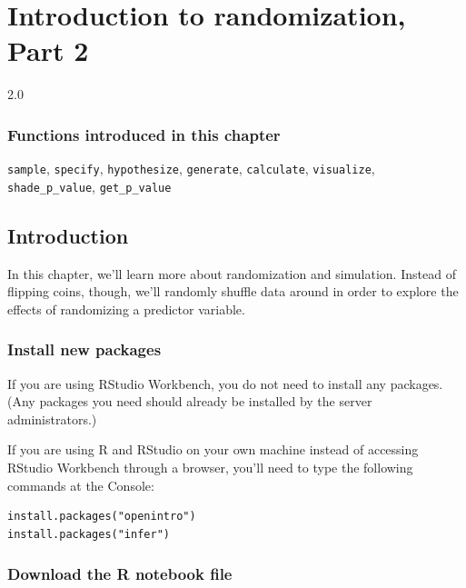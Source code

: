 \documentclass[
]{book}
\begin{document}
\hypertarget{randomization2}{%
\chapter{Introduction to randomization, Part 2}\label{randomization2}}

2.0

\hypertarget{functions-introduced-in-this-chapter-8}{%
\subsection*{Functions introduced in this chapter}\label{functions-introduced-in-this-chapter-8}}

\texttt{sample}, \texttt{specify}, \texttt{hypothesize}, \texttt{generate}, \texttt{calculate}, \texttt{visualize}, \texttt{shade\_p\_value}, \texttt{get\_p\_value}

\hypertarget{randomization2-intro}{%
\section{Introduction}\label{randomization2-intro}}

In this chapter, we'll learn more about randomization and simulation. Instead of flipping coins, though, we'll randomly shuffle data around in order to explore the effects of randomizing a predictor variable.

\hypertarget{randomization2-install}{%
\subsection{Install new packages}\label{randomization2-install}}

If you are using RStudio Workbench, you do not need to install any packages. (Any packages you need should already be installed by the server administrators.)

If you are using R and RStudio on your own machine instead of accessing RStudio Workbench through a browser, you'll need to type the following commands at the Console:

\begin{verbatim}
install.packages("openintro")
install.packages("infer")
\end{verbatim}

\hypertarget{randomization2-download}{%
\subsection{Download the R notebook file}\label{randomization2-download}}
\end{document}
